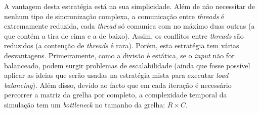 \documentclass[10pt,a4paper,oneside]{article}
\begin{document}
A vantagem desta estratégia está na sua simplicidade. Além de não
necessitar de nenhum tipo de sincronização complexa, a comunicação
entre \textit{threads} é extremamente reduzida, cada \textit{thread}
só comunica com no máximo duas outras (a que contém a tira de cima e a
de baixo). Assim, os conflitos entre \textit{threads} são reduzidos (a
contenção de \textit{threads} é rara). Porém, esta estratégia tem
várias desvantagens. Primeiramente, como a divisão é estática, se o
\textit{input} não for balanceado, podem surgir problemas de
escalabilidade (ainda que fosse possível aplicar as ideias que serão
usadas na estratégia mista para executar \textit{load
  balancing}). Além disso, devido ao facto que em cada iteração é
necessário percorrer a matriz da grelha por completo, a complexidade
temporal da simulação tem um \textit{bottleneck} no tamanho da grelha:
$R \times C$.
\end{document}
